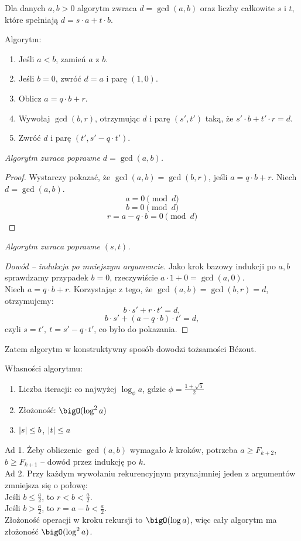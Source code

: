 Dla danych \( a, b > 0 \) algorytm zwraca \( d = \gcd(a,b) \) oraz liczby całkowite \( s \) i \( t \), które spełniają \( d = s\cdot a + t\cdot b \).

\begin{greyframe}
	Algorytm:
	\begin{enumerate}
		\item Jeśli \( a < b \), zamień \( a \) z \( b \).
		\item Jeśli \( b = 0 \), zwróć \( d = a \) i parę \( (1,0) \).
		\item Oblicz \( a = q \cdot b + r \).
		\item Wywołaj \( \gcd(b,r) \), otrzymując \( d \) i parę \( (s', t') \) taką, że \( s'\cdot b + t' \cdot r = d \).
		\item Zwróć \( d \) i parę \( (t', s' - q \cdot t') \).
	\end{enumerate}
\end{greyframe}

\vspace{1em}\noindent
\textit{Algorytm zwraca poprawne \( d = \gcd(a, b) \).}
\begin{proof}
	Wystarczy pokazać, że \( \gcd(a, b) = \gcd(b, r) \), jeśli \( a = q \cdot b + r \). Niech \( d = \gcd(a, b) \).
	\[
		a = 0 \pmod{d}
	\]
	\[
		b = 0 \pmod{d}
	\]
	\[
		r = a - q \cdot b = 0 \pmod{d}
	\]
\end{proof}
\textit{Algorytm zwraca poprawne \( (s, t) \).}
\begin{proof}[Dowód -- indukcja po mniejszym argumencie]
	Jako krok bazowy indukcji po \( a, b \) sprawdzamy przypadek \( b = 0 \), rzeczywiście \( a \cdot 1 + 0 = \gcd(a, 0) \). \\
	Niech \( a = q \cdot b + r \). Korzystając z tego, że \( \gcd(a, b) = \gcd(b, r) = d \), otrzymujemy:
	\[
		b \cdot s' + r \cdot t' = d,
	\]
	\[
		b \cdot s' + (a - q \cdot b) \cdot t' = d,
	\]
	czyli \( s = t', \ t = s' - q \cdot t' \), co było do pokazania.
\end{proof}
Zatem algorytm w konstruktywny sposób dowodzi tożsamości B\'ezout.

Własności algorytmu:
\begin{enumerate}
	\item Liczba iteracji: co najwyżej \( \log_{\phi} a \), gdzie \( \phi = \frac{1 + \sqrt{5}}{2} \)
	\item Złożoność: \( \bigO(\log^2 a) \)
	\item \( \left\lvert s\right\rvert \leq b \), \( \left\lvert t\right\rvert \leq a \)
\end{enumerate}
Ad 1. Żeby obliczenie \( \gcd(a, b) \) wymagało \( k \) kroków, potrzeba \( a \geq F_{k+2} \), \( b \geq F_{k+1} \) -- dowód przez indukcję po \( k \). \\
Ad 2. Przy każdym wywołaniu rekurencyjnym przynajmniej jeden z argumentów zmniejsza się o połowę: \\
Jeśli \( b \leq \frac{a}{2} \), to \( r < b < \frac{a}{2} \). \\
Jeśli \( b > \frac{a}{2} \), to \( r = a - b < \frac{a}{2} \). \\
Złożoność operacji w kroku rekursji  to \( \bigO(\log a) \), więc cały algorytm ma złożoność \( \bigO(\log^2 a) \).